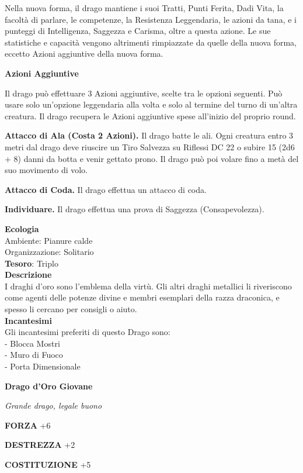 \begin{multicols}{2}
	Nella nuova forma, il drago mantiene i suoi Tratti, Punti Ferita, Dadi Vita, la facoltà di parlare, le competenze, la Resistenza Leggendaria, le azioni da tana, e i punteggi di Intelligenza, Saggezza e Carisma, oltre a questa azione. Le sue statistiche e capacità vengono altrimenti rimpiazzate da quelle della nuova forma, eccetto Azioni aggiuntive della nuova forma.

	\textbf{Azioni Aggiuntive}

	Il drago può effettuare 3 Azioni aggiuntive, scelte tra le opzioni seguenti. Può usare solo un'opzione leggendaria alla volta e solo al termine del turno di un'altra creatura. Il drago recupera le Azioni aggiuntive spese all'inizio del proprio round.

	\textbf{Attacco di Ala (Costa 2 Azioni).} Il drago batte le ali. Ogni creatura entro 3 metri dal drago deve riuscire un Tiro Salvezza su Riflessi DC 22 o subire 15 (2d6 + 8) danni da botta e venir gettato prono. Il drago può poi volare fino a metà del suo movimento di volo.

	\textbf{Attacco di Coda.} Il drago effettua un attacco di coda.

	\textbf{Individuare.} Il drago effettua una prova di Saggezza (Consapevolezza).

	\textbf{Ecologia}\\
	Ambiente: Pianure calde\\
	Organizzazione: Solitario\\
	\textbf{Tesoro}: Triplo\\
	\textbf{Descrizione}\\
	I draghi d'oro sono l'emblema della virtù. Gli altri draghi metallici li riveriscono come agenti delle potenze divine e membri esemplari della razza draconica, e spesso li cercano per consigli o aiuto.\\
	\textbf{Incantesimi}\\
	Gli incantesimi preferiti di questo Drago sono:\\
	- Blocca Mostri\\
	- Muro di Fuoco\\
	- Porta Dimensionale

	\medskip{}\textbf{Drago d'Oro Giovane}

	\textit{Grande drago, legale buono}

	\textbf{FORZA} +6

	\textbf{DESTREZZA} +2

	\textbf{COSTITUZIONE} +5


\end{multicols}
